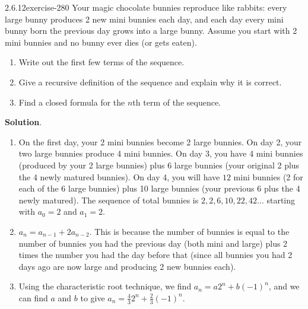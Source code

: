 \documentclass[twoside,11pt,]{book}
\numberwithin{equation}{chapter}
\begin{document}
\begin{divisionsolution}{2.6.12}{}{exercise-280}%
\hypertarget{p-3808}{}%
Your magic chocolate bunnies  reproduce like rabbits: every large bunny produces 2 new mini bunnies each day, and each day every mini bunny born the previous day grows into a large bunny. Assume you start with 2 mini bunnies and no bunny ever dies (or gets eaten).\leavevmode%
\begin{enumerate}[label=(\alph*)]
\item\hypertarget{li-2026}{}\hypertarget{p-3809}{}%
Write out the first few terms of the sequence.%
\item\hypertarget{li-2027}{}\hypertarget{p-3810}{}%
Give a recursive definition of the sequence and explain why it is correct.%
\item\hypertarget{li-2028}{}\hypertarget{p-3811}{}%
Find a closed formula for the \(n\)th term of the sequence.%
\end{enumerate}
%
\par\smallskip%
\noindent\textbf{Solution}.\quad%
\hypertarget{p-3812}{}%
\leavevmode%
\begin{enumerate}[label=(\alph*)]
\item\hypertarget{li-2029}{}\hypertarget{p-3813}{}%
On the first day, your 2 mini bunnies become 2 large bunnies. On day 2, your two large bunnies produce 4 mini bunnies. On day 3, you have 4 mini bunnies (produced by your 2 large bunnies) plus 6 large bunnies (your original 2 plus the 4 newly matured bunnies). On day 4, you will have \(12\) mini bunnies (2 for each of the 6 large bunnies) plus 10 large bunnies (your previous 6 plus the 4 newly matured). The sequence of total bunnies is \(2, 2, 6, 10, 22, 42\ldots\) starting with \(a_0 = 2\) and \(a_1 = 2\).%
\item\hypertarget{li-2030}{}\(a_n = a_{n-1} + 2a_{n-2}\). This is because the number of bunnies is equal to the number of bunnies you had the previous day (both mini and large) plus 2 times the number you had the day before that (since all bunnies you had 2 days ago are now large and producing 2 new bunnies each).%
\item\hypertarget{li-2031}{}\hypertarget{p-3814}{}%
Using the characteristic root technique, we find \(a_n = a2^n + b(-1)^n\), and we can find \(a\) and \(b\) to give \(a_n = \frac{4}{3}2^n + \frac{2}{3}(-1)^n\).%
\end{enumerate}
%
\end{divisionsolution}%
\end{document}
